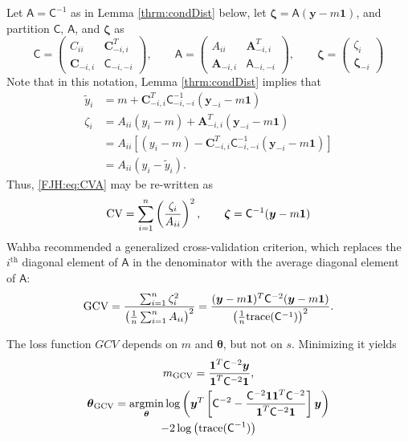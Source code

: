 \documentclass[twocolumn]{svjour3}          %
\newcommand{\bm}[1]{\boldsymbol{#1}}
\newcommand{\trace}[1]{\textup{trace}{#1}}
\newcommand{\vtheta}{{\bm{\theta}}}
\newcommand{\vzeta}{{\bm{\zeta}}}
\newcommand{\vA}{\bm{A}}
\newcommand{\vC}{\bm{C}}
\newcommand{\vy}{\bm{y}}
\newcommand{\vone}{\bm{1}}
\newcommand{\mA}{\mathsf{A}}
\newcommand{\mC}{\mathsf{C}}
\providecommand{\argmin}{\operatorname*{argmin}}
\begin{document}
Let $\mA = \mC^{-1}$ as in Lemma \ref{thrm:condDist} below, let $\vzeta = \mA (\vy - m \vone)$, and partition $\mC$, $\mA$, and $\vzeta$ as
\begin{equation*}
\mC = \begin{pmatrix} C_{ii}  & \vC_{-i,i}^T \\  \vC_{-i,i} & \mC_{-i,-i}\end{pmatrix}, \qquad
\mA = \begin{pmatrix} A_{ii}  & \vA_{-i,i}^T \\  \vA_{-i,i} & \mA_{-i,-i}\end{pmatrix}, \qquad \vzeta = \begin{pmatrix} \zeta_i   \\  \vzeta_{-i} \end{pmatrix}
\end{equation*}
Note that in this notation, Lemma \ref{thrm:condDist} implies that 
\begin{align*}
\widetilde{y}_i & = m + \vC^T_{-i,i} \mC_{-i,-i}^{-1} (\vy_{-i} -m \vone)  \\
\zeta_i  & = A_{ii}(y_i - m) + \vA_{-i,i}^T(\vy_{-i} - m \vone) \\
& = A_{ii}[(y_i - m) - \vC^T_{-i,i} \mC_{-i,-i}^{-1} (\vy_{-i} -m \vone)] \\
& = A_{ii}(y_i - \widetilde{y}_i).
\end{align*}
Thus, \eqref{FJH:eq:CVA} may be re-written as 
\begin{equation} \label{FJH:eq:CVA}
\textup{CV} = \sum_{i=1}^n \left(\frac{\zeta_i}{A_{ii}} \right)^2, \qquad \vzeta = \mC^{-1}(\vy - m \vone)
\end{equation}
Wahba recommended a generalized cross-validation criterion, which replaces the $i^{\text{th}}$ diagonal element of $\mA$ in the denominator with the average diagonal element of $\mA$:
\begin{equation} \label{FJH:eq:CVA}
\textup{GCV} 
= \frac{\sum_{i=1}^n\zeta_i^2}{\left(\frac 1n \sum_{i=1}^n A_{ii} \right)^2} 
= \frac{(\vy - m\vone)^T \mC^{-2} (\vy - m \vone)}{\left(\frac 1n \trace(\mC^{-1}) \right)^2}.
\end{equation}

The loss function $GCV$ depends on $m$ and $\vtheta$, but not on $s$.  Minimizing it yields
\begin{multline}
m_{\textup{GCV}} = \frac{\vone^T \mC^{-2} \vy}{\vone^T \mC^{-2} \vone},\\ 
\vtheta_{\textup{GCV}} = \argmin_\vtheta \log \left (  \vy^T \left[\mC^{-2} - \frac{\mC^{-2} \vone \vone^T \mC^{-2}}{\vone^T \mC^{-2} \vone}  \right] \vy \right ) 
\\
- 2 \log \left ( \trace(\mC^{-1}) \right )
\end{multline}
\end{document}
